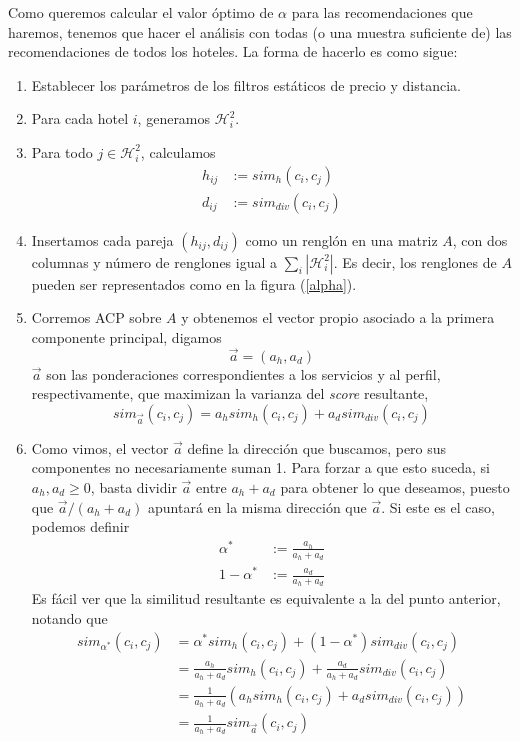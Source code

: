 \documentclass[12pt]{report}
\newcommand{\HH}{\mathcal{H}}
\begin{document}
Como queremos calcular el valor óptimo de $\alpha$ para las recomendaciones que haremos, tenemos que hacer el análisis con todas (o una muestra suficiente de) las recomendaciones de todos los hoteles. La forma de hacerlo es como sigue:
\begin{enumerate}
	\item Establecer los parámetros de los filtros estáticos de precio y distancia.
	\item Para cada hotel $i$, generamos $\HH_i^2$.
	\item Para todo $j \in \HH_i^2$, calculamos
	\begin{align*}
		h_{ij} &:= sim_h(c_i, c_j)\\
		d_{ij} &:= sim_{div}(c_i, c_j)
	\end{align*}
	\item Insertamos cada pareja $(h_{ij}, d_{ij})$ como un renglón en una matriz $A$, con dos columnas y número de renglones igual a $\sum_i |\HH_i^2|$. Es decir, los renglones de $A$ pueden ser representados como en la figura (\ref{alpha}).
	\item Corremos ACP sobre $A$ y obtenemos el vector propio asociado a la primera componente principal, digamos
	\[
	\vec{a} = (a_h, a_d)
	\]
	$\vec{a}$ son las ponderaciones correspondientes a los servicios y al perfil, respectivamente, que maximizan la varianza del \emph{score} resultante,
	\[
	sim_{\vec{a}}(c_i, c_j) = a_h sim_h(c_i, c_j) + a_d sim_{div}(c_i, c_j)
	\]
	\item Como vimos, el vector $\vec{a}$ define la dirección que buscamos, pero sus componentes no necesariamente suman 1. Para forzar a que esto suceda, si $a_h, a_d \geq 0$, basta dividir $\vec{a}$ entre $a_h + a_d$ para obtener lo que deseamos, puesto que $\vec{a} / (a_h + a_d)$ apuntará en la misma dirección que $\vec{a}$. Si este es el caso, podemos definir
	\begin{align*}
		\alpha^* &:= \frac{a_h}{a_h + a_d}\\
		1 - \alpha^* &:= \frac{a_d}{a_h + a_d}
	\end{align*}
	Es fácil ver que la similitud resultante es equivalente a la del punto anterior, notando que
	\begin{align*}
	sim_{\alpha^*}(c_i, c_j) &= \alpha^* sim_h(c_i, c_j) + (1 - \alpha^*) sim_{div}(c_i, c_j)\\
	&= \frac{a_h}{a_h + a_d} sim_h(c_i, c_j) + \frac{a_d}{a_h + a_d} sim_{div}(c_i, c_j)\\
	&= \frac{1}{a_h + a_d} (a_h sim_h(c_i, c_j) + a_d sim_{div}(c_i, c_j))\\
	&= \frac{1}{a_h + a_d} sim_{\vec{a}}(c_i, c_j)
	\end{align*}
\end{enumerate}
\end{document}
